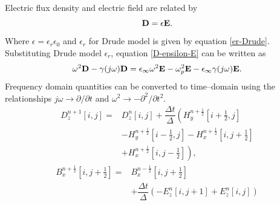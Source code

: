 \documentclass[portrait,final,a1paper,fontscale=0.4]{baposter}
\begin{document}
\begin{poster}
{\begin{minipage}{\linewidth}
  \end{minipage}
  }
  {
Electric flux density and electric field are related by
\vspace{-0.1cm}
\begin{equation}
\centering
\textbf{D} = \epsilon \textbf{E}.
\label{D-epsilon-E}
\end{equation}
\vspace{-0.1cm}
Where $\epsilon = \epsilon_r\epsilon_0$ and $\epsilon_r$ for Drude model is given by equation \ref{er-Drude}. Substituting Drude model $\epsilon_r$, equation \ref{D-epsilon-E} can be written as
\vspace{-0.1cm}
\begin{equation}
\centering
\omega^2\textbf{D}-\gamma(j\omega)\textbf{D} = \epsilon_\infty\omega^2\textbf{E}-\omega^2_p\textbf{E}-\epsilon_\infty \gamma(j\omega)\textbf{E}.
\label{D-epsilonomega-E-frequency-domain}
\end{equation}
Frequency domain quantities can be converted to time--domain using the relationships $j\omega \rightarrow \partial/\partial t$ and $\omega^2 \rightarrow - \partial^2/\partial t^2$. 
\begin{equation}
\begin{split}
D^{n+1}_z \left[i,j\right]=&D^{n}_z \left[i,j\right]+\dfrac{\Delta t}{\Delta}\left(H^{n+\frac{1}{2}}_y\left[i+\frac{1}{2},j\right]\right.\\
&\left.-H^{n+\frac{1}{2}}_y \left[i-\frac{1}{2},j\right]-H^{n+\frac{1}{2}}_x \left[i,j+\frac{1}{2}\right]\right.\\
&\left.+H^{n+\frac{1}{2}}_x \left[i,j-\frac{1}{2}\right]\right),
\end{split}
\label{eq:Dz-2D-FDTD-TMz}
\end{equation}
\begin{equation}
\begin{split}
B^{n+\frac{1}{2}}_x \left[i,j+\frac{1}{2}\right]=&B^{n-\frac{1}{2}}_x \left[i,j+\frac{1}{2}\right]\\& + \dfrac{\Delta t}{\Delta} \left(-E^{n}_z \left[i,j+1\right] + E^{n}_z \left[i,j\right] \right)
\end{split}
\label{eq:Bx-2D-FDTD-TMz}
\end{equation}
\begin{equation}
\begin{split}

\end{split}
\end{equation}}
\end{poster}
\end{document}
